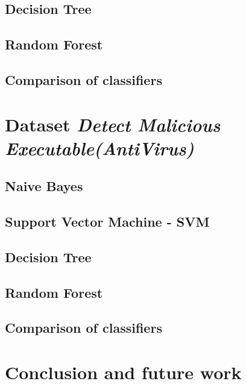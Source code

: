 \documentclass[11pt,a4paper,titlepage]{article}
\begin{document}
\subsection{Decision Tree}
\subsection{Random Forest}
\subsection{Comparison of classifiers}

\section{Dataset \textit{Detect Malicious Executable(AntiVirus)}}

\subsection{Naive Bayes}
\subsection{Support Vector Machine - SVM}
\subsection{Decision Tree}
\subsection{Random Forest}
\subsection{Comparison of classifiers}

\section{Conclusion and future work}
\end{document}
